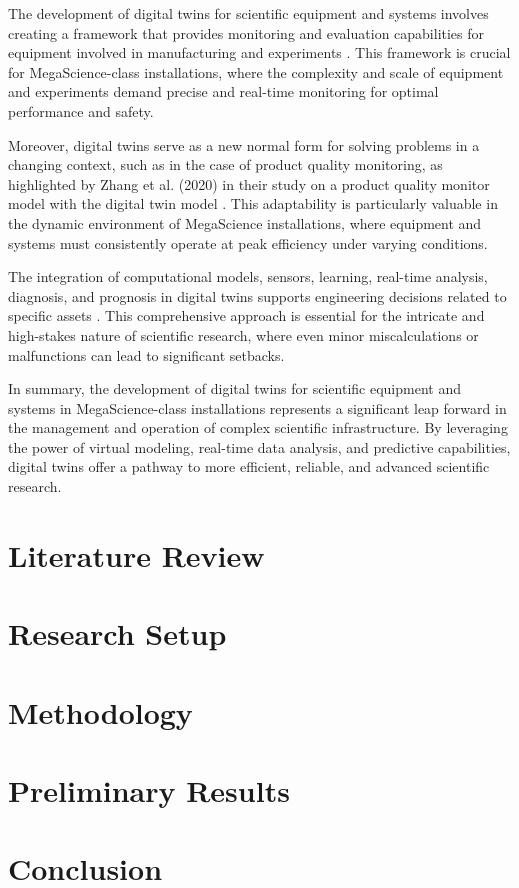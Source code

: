 \documentclass[12pt]{article}
\begin{document}
The development of digital twins for scientific equipment and systems involves
creating a framework that provides monitoring and evaluation capabilities for
equipment involved in manufacturing and experiments \cite{Duan2021Design}. This
framework is crucial for MegaScience-class installations, where the complexity
and scale of equipment and experiments demand precise and real-time monitoring
for optimal performance and safety.

Moreover, digital twins serve as a new normal form for solving problems in a
changing context, such as in the case of product quality monitoring, as
highlighted by Zhang et al. (2020) in their study on a product quality monitor
model with the digital twin model \cite{Zhang2020A}. This adaptability is particularly
valuable in the dynamic environment of MegaScience installations, where
equipment and systems must consistently operate at peak efficiency under
varying conditions.

The integration of computational models, sensors, learning, real-time analysis,
diagnosis, and prognosis in digital twins supports engineering decisions
related to specific assets \cite{Ritto2021Digital}. This comprehensive approach
is essential for the intricate and high-stakes nature of scientific research,
where even minor miscalculations or malfunctions can lead to significant
setbacks.

In summary, the development of digital twins for scientific equipment and
systems in MegaScience-class installations represents a significant leap
forward in the management and operation of complex scientific infrastructure.
By leveraging the power of virtual modeling, real-time data analysis, and
predictive capabilities, digital twins offer a pathway to more efficient,
reliable, and advanced scientific research.

\section{Literature Review}

\section{Research Setup}

\section{Methodology}

\section{Preliminary Results}


\section{Conclusion}



\end{document}
